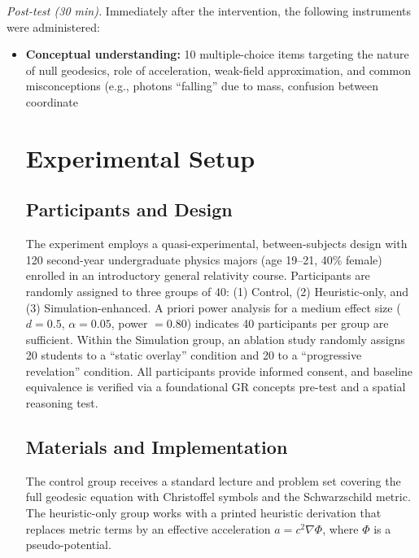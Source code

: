 \documentclass{article}
\begin{document}
\textit{Post-test (30 min).} Immediately after the intervention, the following instruments were administered:
\begin{itemize}
    \item \textbf{Conceptual understanding:} 10 multiple-choice items targeting the nature of null geodesics, role of acceleration, weak-field approximation, and common misconceptions (e.g., photons “falling” due to mass, confusion between coordinate

\section{Experimental Setup}

\subsection{Participants and Design}
The experiment employs a quasi-experimental, between-subjects design with 120 second-year undergraduate physics majors (age 19--21, 40\% female) enrolled in an introductory general relativity course. Participants are randomly assigned to three groups of 40: (1) Control, (2) Heuristic-only, and (3) Simulation-enhanced. A priori power analysis for a medium effect size ($d=0.5$, $\alpha=0.05$, power $=0.80$) indicates 40 participants per group are sufficient. Within the Simulation group, an ablation study randomly assigns 20 students to a “static overlay” condition and 20 to a “progressive revelation” condition. All participants provide informed consent, and baseline equivalence is verified via a foundational GR concepts pre-test and a spatial reasoning test.

\subsection{Materials and Implementation}
The control group receives a standard lecture and problem set covering the full geodesic equation with Christoffel symbols and the Schwarzschild metric. The heuristic-only group works with a printed heuristic derivation that replaces metric terms by an effective acceleration $a = c^2\nabla\Phi$, where $\Phi$ is a pseudo-potential.


\end{itemize}
\end{document}
